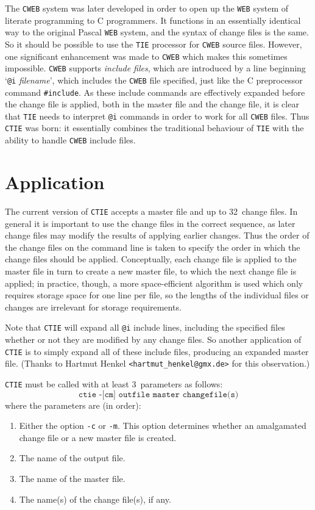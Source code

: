 \documentclass{article}
\let\mc=\small
\def\CEE/{{\mc C\spacefactor1000}}
\let\.=\texttt
\begin{document}
The \.{CWEB} system was later developed in order to open up the
\.{WEB} system of literate programming to \CEE/ programmers.  It
functions in an essentially identical way to the original Pascal
\.{WEB} system, and the syntax of change files is the same.  So it
should be possible to use the \.{TIE} processor for \.{CWEB} source
files.  However, one significant enhancement was made to \.{CWEB}
which makes this sometimes impossible.  \.{CWEB} supports
\textit{include files}, which are introduced by a line beginning
`\.{@i} \textit{filename}', which includes the \.{CWEB} file
specified, just like the \CEE/ preprocessor command \.{\#include}.  As
these include commands are effectively expanded before the change file
is applied, both in the master file and the change file, it is clear
that \.{TIE} needs to interpret \.{@i} commands in order to work for
all \.{CWEB} files.  Thus \.{CTIE} was born: it essentially combines
the traditional behaviour of \.{TIE} with the ability to handle
\.{CWEB} include files.


\section{Application}

The current version of \.{CTIE} accepts a master file and up to
32~change files.  In general it is important to use the change files
in the correct sequence, as later change files may modify the results
of applying earlier changes.  Thus the order of the change files on
the command line is taken to specify the order in which the change
files should be applied.  Conceptually, each change file is applied to
the master file in turn to create a new master file, to which the next
change file is applied; in practice, though, a more space-efficient
algorithm is used which only requires storage space for one line per
file, so the lengths of the individual files or changes are irrelevant
for storage requirements.

Note that \.{CTIE} will expand all \.{@i} include lines, including the
specified files whether or not they are modified by any change files.
So another application of \.{CTIE} is to simply expand all of these
include files, producing an expanded master file.  (Thanks to Hartmut
Henkel \.{<hartmut\_henkel@gmx.de>} for this observation.)

\.{CTIE} must be called with at least 3~parameters as follows:
$$\texttt{ctie -[cm] outfile master changefile(s)}$$
where the parameters are (in order):
\begin{enumerate}
  
\item Either the option \.{-c} or \.{-m}.  This option determines
  whether an amalgamated change file or a new master file is created.

\item The name of the output file.

\item The name of the master file.

\item The name(s) of the change file(s), if any.

\end{enumerate}
\end{document}
